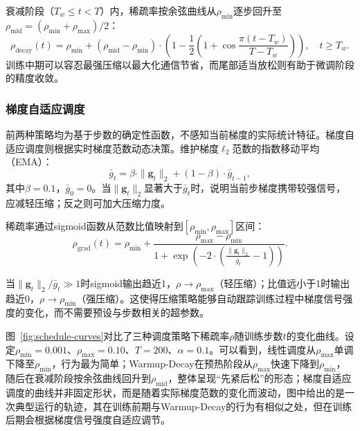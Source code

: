 衰减阶段（\(T_w \le t < T\)）内，稀疏率按余弦曲线从\(\rho_{\min}\)逐步回升至\(\rho_{\text{mid}} = (\rho_{\min} + \rho_{\max})/2\)：
\begin{equation}
\rho_{\text{decay}}(t) = \rho_{\min} + (\rho_{\text{mid}} - \rho_{\min}) \cdot \left(1 - \frac{1}{2}\left(1 + \cos\frac{\pi(t - T_w)}{T - T_w}\right)\right), \quad t \ge T_w.
\label{eq:decay}
\end{equation}
训练中期可以容忍最强压缩以最大化通信节省，而尾部适当放松则有助于微调阶段的精度收敛。

\subsubsection{梯度自适应调度}

前两种策略均为基于步数的确定性函数，不感知当前梯度的实际统计特征。梯度自适应调度则根据实时梯度范数动态决策。维护梯度\(\ell_2\)范数的指数移动平均（EMA）：
\begin{equation}
\bar{g}_t = \beta \cdot \|\mathbf{g}_t\|_2 + (1-\beta) \cdot \bar{g}_{t-1},
\label{eq:grad-ema}
\end{equation}
其中\(\beta = 0.1\)，\(\bar{g}_0 = 0\)。当\(\|\mathbf{g}_t\|_2\)显著大于\(\bar{g}_t\)时，说明当前步梯度携带较强信号，应减轻压缩；反之则可加大压缩力度。

稀疏率通过sigmoid函数从范数比值映射到\([\rho_{\min}, \rho_{\max}]\)区间：
\begin{equation}
\rho_{\text{grad}}(t) = \rho_{\min} + \frac{\rho_{\max} - \rho_{\min}}{1 + \exp\left(-2 \cdot \left(\frac{\|\mathbf{g}_t\|_2}{\bar{g}_t} - 1\right)\right)}.
\label{eq:grad-adaptive}
\end{equation}

当\(\|\mathbf{g}_t\|_2 / \bar{g}_t \gg 1\)时sigmoid输出趋近1，\(\rho \to \rho_{\max}\)（轻压缩）；比值远小于1时输出趋近0，\(\rho \to \rho_{\min}\)（强压缩）。这使得压缩策略能够自动跟踪训练过程中梯度信号强度的变化，而不需要预设与步数相关的超参数。

图~\ref{fig:schedule-curves}对比了三种调度策略下稀疏率\(\rho\)随训练步数\(t\)的变化曲线。设定\(\rho_{\min} = 0.001\)、\(\rho_{\max} = 0.10\)、\(T = 200\)、\(\alpha = 0.1\)。可以看到，线性调度从\(\rho_{\max}\)单调下降至\(\rho_{\min}\)，行为最为简单；Warmup-Decay在预热阶段从\(\rho_{\max}\)快速下降到\(\rho_{\min}\)，随后在衰减阶段按余弦曲线回升到\(\rho_{\text{mid}}\)，整体呈现``先紧后松''的形态；梯度自适应调度的曲线并非固定形状，而是随着实际梯度范数的变化而波动，图中给出的是一次典型运行的轨迹，其在训练前期与Warmup-Decay的行为有相似之处，但在训练后期会根据梯度信号强度自适应调节。

